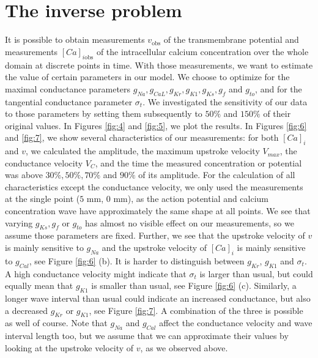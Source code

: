 \documentclass[12pt,a4paper]{article}
\begin{document}
\section{The inverse problem} \label{The inverse problem}
It is possible to obtain measurements $v_{\text{obs}}$ of the transmembrane potential and measurements $[Ca]_{i\text{obs}}$ of the intracellular calcium concentration over the whole domain at discrete points in time. With those measurements, we want to estimate the value of certain parameters in our model. We choose to optimize for the maximal conductance parameters $g_{Na}, g_{CaL}, g_{Kr}, g_{K1}, g_{Ks}, g_{f}$ and $g_{to}$, and for the tangential conductance parameter $\sigma_t$. We investigated the sensitivity of our data to those parameters by setting them subsequently to $50\%$ and $150\%$ of their original values. In Figures \ref{fig:4} and \ref{fig:5}, we plot the results.
In Figures \ref{fig:6} and \ref{fig:7}, we show several characteristics of our measurements: for both $[Ca]_i$ and $v$, we calculated the amplitude, the maximum upstroke velocity $V_{max}$, the conductance velocity $V_{C}$, and the time the measured concentration or potential was above $30\%, 50\%, 70\%$ and $90\%$ of its amplitude. For the calculation of all characteristics except the conductance velocity, we only used the measurements at the single point ($5$ mm, $0$ mm), as the action potential and calcium concentration wave have approximately the same shape at all points. We see that varying $g_{Ks}, g_{f}$ or $g_{to}$ has almost no visible effect on our measurements, so we assume those parameters are fixed. Further, we see that the upstroke velocity of $v$ is mainly sensitive to $g_{Na}$ and the upstroke velocity of $[Ca]_i$ is mainly sensitive to $g_{Cal}$, see Figure \ref{fig:6} (b). It is harder to distinguish between $g_{Kr}$, $g_{K1}$ and $\sigma_t$. A high conductance velocity might indicate that $\sigma_t$ is larger than usual, but could equally mean that $g_{K1}$ is smaller than usual, see Figure \ref{fig:6} (c). Similarly, a longer wave interval than usual could indicate an increased conductance, but also a decreased $g_{Kr}$ or $g_{K1}$, see Figure \ref{fig:7}. A combination of the three is possible as well of course. Note that $g_{Na}$ and $g_{Cal}$ affect the conductance velocity and wave interval length too, but we assume that we can approximate their values by looking at the upstroke velocity of $v$, as we observed above.
%
\end{document}
